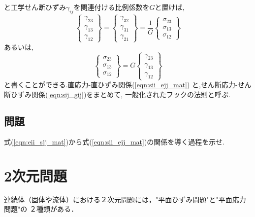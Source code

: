 \documentclass[10pt,a4j]{jarticle}
\begin{document}
と工学せん断ひずみ$\gamma_{ij}$を関連付ける比例係数を$G$と置けば,
\begin{equation}
	\left\{ 
		\begin{array}{*{20}{c}}
		\gamma_{23}\\
		\gamma_{13}\\
		\gamma_{12}
		\end{array}
	\right\} 
	=
	\left\{ 
		\begin{array}{*{20}{c}}
		\gamma_{32}\\
		\gamma_{31}\\
		\gamma_{21}
		\end{array}
	\right\} 
	= \frac{1}{G}
	\left\{
		\begin{array}{*{20}{c}}
		\sigma _{23}\\
		\sigma _{13}\\
		\sigma _{12}
		\end{array}
	\right\}
	\label{eqn:gij_sij}
\end{equation}
あるいは,
\begin{equation}
	\left\{ 
		\begin{array}{*{20}{c}}
		\sigma_{23}\\
		\sigma_{13}\\
		\sigma_{12}
		\end{array}
	\right\} 
	=
	G
	\left\{
		\begin{array}{*{20}{c}}
		\gamma_{23}\\
		\gamma_{13}\\
		\gamma_{12}
		\end{array}
	\right\}
	\label{eqn:sij_gij}
\end{equation}
と書くことができる.直応力-直ひずみ関係(\ref{eqn:sii_ejj_mat})
と,せん断応力-せん断ひずみ関係(\ref{eqn:sij_gij})をまとめて,
一般化されたフックの法則と呼ぶ.
\subsection{問題}
式(\ref{eqn:eii_sjj_mat})から式(\ref{eqn:sii_ejj_mat})の関係を導く過程を示せ. 
\section{2次元問題}
連続体（固体や流体）における２次元問題には，"平面ひずみ問題"と"平面応力問題"の
２種類がある．
\end{document}
